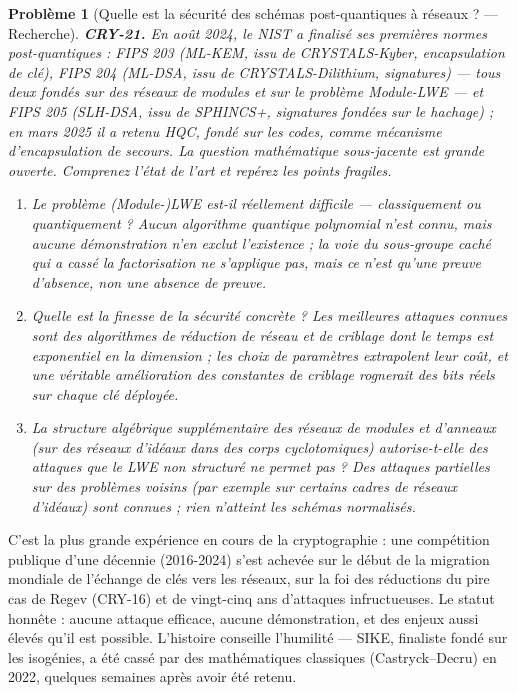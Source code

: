 \documentclass[11pt]{article}
\newtheorem{problem}{Problème}
\begin{document}
\begin{problem}[{Quelle est la sécurité des schémas post-quantiques à réseaux ? --- Recherche}]
\textbf{CRY-21.} En août 2024, le NIST a finalisé ses premières
normes post-quantiques : FIPS 203 (ML-KEM, issu de CRYSTALS-Kyber, encapsulation de clé),
FIPS 204 (ML-DSA, issu de CRYSTALS-Dilithium, signatures) --- tous deux fondés sur des réseaux
de modules et sur le problème Module-LWE --- et FIPS 205 (SLH-DSA, issu de SPHINCS+,
signatures fondées sur le hachage) ; en mars 2025 il a retenu HQC, fondé sur les codes, comme
mécanisme d'encapsulation de secours. La question mathématique sous-jacente est grande
ouverte. Comprenez l'état de l'art et repérez les points fragiles.
\begin{enumerate}
\item[(a)] Le problème (Module-)LWE
est-il réellement difficile --- classiquement ou quantiquement ? Aucun algorithme quantique
polynomial n'est connu, mais aucune démonstration n'en exclut l'existence ; la voie du
sous-groupe caché qui a cassé la factorisation ne s'applique pas, mais ce n'est qu'une preuve
d'absence, non une absence de preuve.
\item[(b)] Quelle est la finesse de la sécurité concrète ? Les meilleures attaques connues sont des
algorithmes de réduction de réseau et de criblage dont le temps est exponentiel en la
dimension ; les choix de paramètres extrapolent leur coût, et une véritable amélioration des
constantes de criblage rognerait des bits réels sur chaque clé déployée.
\item[(c)] La structure
algébrique supplémentaire des réseaux de modules et d'anneaux (sur des réseaux d'idéaux dans
des corps cyclotomiques) autorise-t-elle des attaques que le LWE non structuré ne permet
pas ? Des attaques partielles sur des problèmes voisins (par exemple sur certains cadres de
réseaux d'idéaux) sont connues ; rien n'atteint les schémas normalisés.
\end{enumerate}

\end{problem}

\noindent C'est la plus grande expérience en cours de la cryptographie : une
compétition publique d'une décennie (2016-2024) s'est achevée sur le début de la migration
mondiale de l'échange de clés vers les réseaux, sur la foi des réductions du pire cas de
Regev (CRY-16) et de vingt-cinq ans d'attaques infructueuses. Le statut honnête : aucune
attaque efficace, aucune démonstration, et des enjeux aussi élevés qu'il est possible.
L'histoire conseille l'humilité --- SIKE, finaliste fondé sur les isogénies, a été cassé par des
mathématiques classiques (Castryck--Decru) en 2022, quelques semaines après avoir été
retenu.
\end{document}
